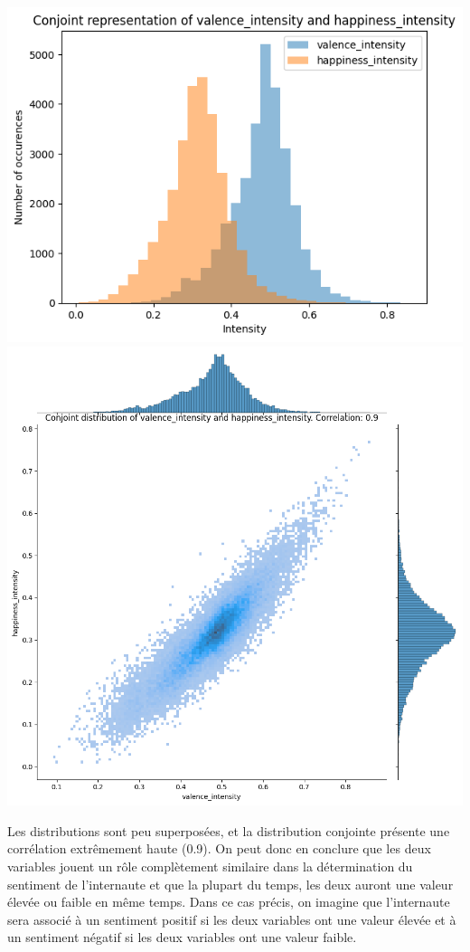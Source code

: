 \documentclass{article}
\begin{document}
\begin{center}
    \includegraphics[scale=0.39]{./img/conjoint_representation_valence_intensity_happiness_intensity.png}
    \includegraphics[scale=0.23]{./img/conjoint_distribution_valence_intensity_happiness_intensity.png}
\end{center}

Les distributions sont peu superposées, et la distribution conjointe présente une corrélation
extrêmement haute (0.9). On peut donc en conclure que les deux variables jouent
un rôle complètement similaire dans la détermination du sentiment de l'internaute et que
la plupart du temps, les deux auront une valeur élevée ou faible en même temps. Dans ce cas
précis, on imagine que l'internaute sera associé à un sentiment positif si les deux variables
ont une valeur élevée et à un sentiment négatif si les deux variables ont une valeur faible.
\end{document}
